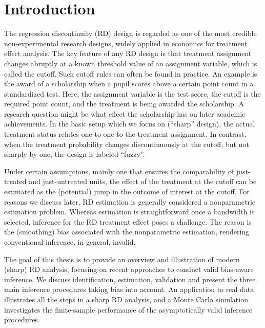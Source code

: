 


\section{Introduction}

The regression discontinuity (RD) design is regarded as one of the most credible non-experimental research designs,
widely applied in economics for treatment effect analysis.
The key feature of any RD design is that treatment assignment changes abruptly at a known threshold value of an assignment variable,
which is called the cutoff.
Such cutoff rules can often be found in practice.
An example is the award of a scholarship when a pupil scores above a certain point count in a standardized test.
Here, the assignment variable is the test score, the cutoff is the required point count, and the treatment is being awarded the scholarship.
A research question might be what effect the scholarship has on later academic achievements.
In the basic setup which we focus on (\enquote{sharp} design), the actual treatment status relates one-to-one to the treatment assignment.
In contrast, when the treatment probability changes discontinuously at the cutoff,
but not sharply by one, the design is labeled \enquote{fuzzy}.

Under certain assumptions, mainly one that ensures the comparability of just-treated and just-untreated units,
the effect of the treatment at the cutoff can be estimated as the (potential) jump in the outcome of interest at the cutoff.
For reasons we discuss later, RD estimation is generally considered a nonparametric estimation problem.
Whereas estimation is straightforward once a bandwidth is selected,
inference for the RD treatment effect poses a challenge.
The reason is the (smoothing) bias associated with the nonparametric estimation,
rendering conventional inference, in general, invalid.

The goal of this thesis is to provide an overview and illustration of modern (sharp) RD analysis,
focusing on recent approaches to conduct valid bias-aware inference.
We discuss identification, estimation, validation and present the three main inference procedures taking bias into account.
An application to real data illustrates all the steps in a sharp RD analysis,
and a Monte Carlo simulation investigates the finite-sample performance of the asymptotically valid inference procedures.

